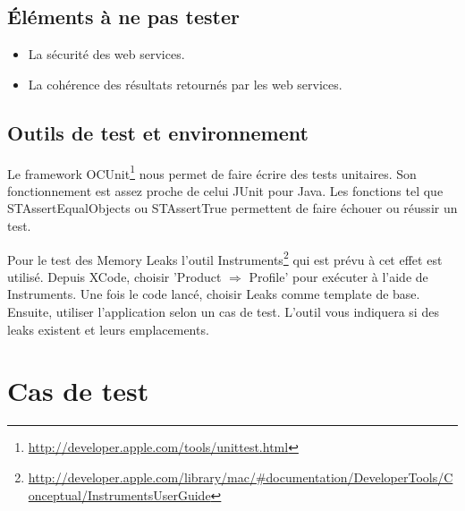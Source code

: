 	\subsection{Éléments à ne pas tester}
		\begin{itemize}
			\item La sécurité des web services.
			\item La cohérence des résultats retournés par les web services.
		\end{itemize}
	\subsection{Outils de test et environnement}
		Le framework OCUnit\footnote{\url{http://developer.apple.com/tools/unittest.html}} nous permet de faire écrire des tests unitaires. Son fonctionnement est assez proche de celui JUnit pour Java. Les fonctions tel que STAssertEqualObjects ou STAssertTrue permettent de faire échouer ou réussir un test.
		
		Pour le test des Memory Leaks l'outil Instruments\footnote{\url{http://developer.apple.com/library/mac/\#documentation/DeveloperTools/Conceptual/InstrumentsUserGuide}} qui est prévu à cet effet est utilisé. Depuis XCode, choisir 'Product \begin{math}
		\Rightarrow \end{math} Profile' pour exécuter à l'aide de Instruments. Une fois le code lancé, choisir Leaks comme template de base. Ensuite, utiliser l'application selon un cas de test. L'outil vous indiquera si des leaks existent et leurs emplacements.
		 
\section{Cas de test \label{tc}}
